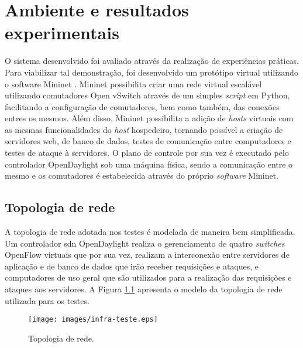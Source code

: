 \chapter{Ambiente e resultados experimentais}
\label{cap:testes}


O sistema desenvolvido foi avaliado através da realização de experiências práticas.
Para viabilizar tal demonstração, foi desenvolvido um protótipo virtual utilizando o software Mininet \cite{website:mininet}. Mininet possibilita criar uma rede virtual escalável utilizando comutadores Open vSwitch \cite{Pfaff:2009} através de um simples \textit{script} em Python\cite{Python:2017}, facilitando a configuração de comutadores, bem como também, das conexões entres os mesmos. Além disso, Mininet possibilita a adição de \textit{hosts} virtuais com as mesmas funcionalidades do \textit{host} hospedeiro, tornando possível a criação de servidores \gls{web}, de banco de dados, testes de comunicação entre computadores e testes de ataque à servidores.
O plano de controle por sua vez é executado pelo controlador OpenDaylight \cite{website:odl} sob uma máquina física, sendo a comunicação entre o mesmo e os comutadores é estabelecida através do próprio \textit{software} Mininet.


\section{Topologia de rede}

A topologia de rede adotada nos testes é modelada de maneira bem simplificada. 
Um controlador \gls{sdn} OpenDaylight realiza o gerenciamento de quatro \textit{switches} OpenFlow virtuais que por sua vez, realizam a interconexão entre servidores de aplicação e de banco de dados que irão receber requisições e ataques, e computadores de uso geral que são utilizados para a realização das requisições e ataques aos servidores. A Figura \ref{fig:infra-testes} apresenta o modelo da topologia de rede utilizada para os testes.

\begin{figure}[H]
  \centering
  \caption{Topologia de rede.}
  \texttt{[image: images/infra-teste.eps]}
  \label{fig:infra-testes}
\end{figure}

